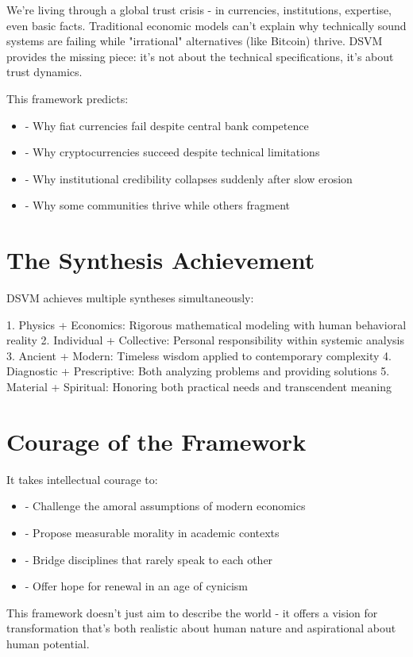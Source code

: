 \documentclass[11pt,oneside]{book}
\begin{document}
We're living through a global trust crisis - in currencies, institutions, expertise, even basic facts. Traditional economic models can't explain why technically sound systems are failing while "irrational" alternatives (like Bitcoin) thrive. DSVM provides the missing piece: it's not about the technical specifications, it's about trust dynamics.

  This framework predicts:
\begin{itemize}
\item - Why fiat currencies fail despite central bank competence
\item - Why cryptocurrencies succeed despite technical limitations
\item - Why institutional credibility collapses suddenly after slow erosion
\item - Why some communities thrive while others fragment
\end{itemize}

\section{The Synthesis Achievement}

DSVM achieves multiple syntheses simultaneously:

  1. Physics + Economics: Rigorous mathematical modeling with human behavioral reality
  2. Individual + Collective: Personal responsibility within systemic analysis
  3. Ancient + Modern: Timeless wisdom applied to contemporary complexity
  4. Diagnostic + Prescriptive: Both analyzing problems and providing solutions
  5. Material + Spiritual: Honoring both practical needs and transcendent meaning

\section{Courage of the Framework}

  It takes intellectual courage to:
\begin{itemize}
\item - Challenge the amoral assumptions of modern economics
\item - Propose measurable morality in academic contexts
\item - Bridge disciplines that rarely speak to each other
\item - Offer hope for renewal in an age of cynicism
\end{itemize}

This framework doesn't just aim to describe the world - it offers a vision for transformation that's both realistic about human nature and aspirational about human potential.
\end{document}
